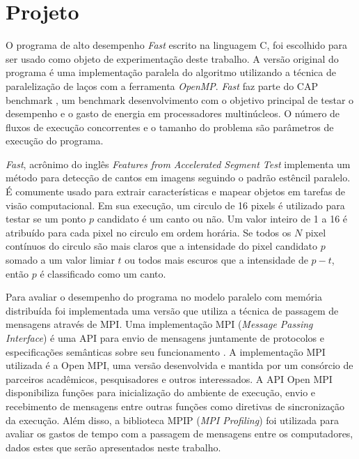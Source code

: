 \documentclass[12pt]{article}
\begin{document}
\section{Projeto} \label{sec:projeto}

O programa de alto desempenho \textit{Fast} escrito na linguagem C, foi escolhido para ser usado como objeto de experimentação deste trabalho. A versão original do programa é uma implementação paralela do algoritmo utilizando a técnica de paralelização de laços com a ferramenta \textit{OpenMP}. \textit{Fast} faz parte do CAP benchmark \cite{souza2017cap}, um benchmark desenvolvimento com o objetivo principal de testar o desempenho e o gasto de energia em processadores multinúcleos. O número de fluxos de execução concorrentes e o tamanho do problema são parâmetros de execução do programa.

\textit{Fast}, acrônimo do inglês \textit{Features from Accelerated Segment Test} implementa um método para detecção de cantos em imagens seguindo o padrão estêncil paralelo. É comumente usado para extrair características e mapear objetos em tarefas de visão computacional. Em sua execução, um circulo de 16 pixels é utilizado para testar se um ponto \(p\) candidato é um canto ou não. Um valor inteiro de 1 a 16 é atribuído para cada pixel no circulo em ordem horária. Se todos os \(N\) pixel contínuos do circulo são mais claros que a intensidade do pixel candidato \(p\) somado a um valor limiar \(t\) ou todos mais escuros que a intensidade de \(p - t \), então \(p\) é classificado como um canto.
	
Para avaliar o desempenho do programa no modelo paralelo com memória distribuída foi implementada uma versão que utiliza a técnica de passagem de mensagens através de MPI. Uma implementação MPI (\textit{Message Passing Interface}) é uma API para envio de mensagens juntamente de protocolos e especificações semânticas sobre seu funcionamento \cite{Lusk96ahigh-performance}. A implementação MPI utilizada é a Open MPI, uma versão desenvolvida e mantida por um consórcio de parceiros acadêmicos, pesquisadores e outros interessados. A API Open MPI disponibiliza funções para inicialização do ambiente de execução, envio e recebimento de mensagens entre outras funções como diretivas de sincronização da execução. Além disso, a biblioteca MPIP (\textit{MPI Profiling}) foi utilizada para avaliar os gastos de tempo com a passagem de mensagens entre os computadores, dados estes que serão apresentados neste trabalho.
\end{document}
